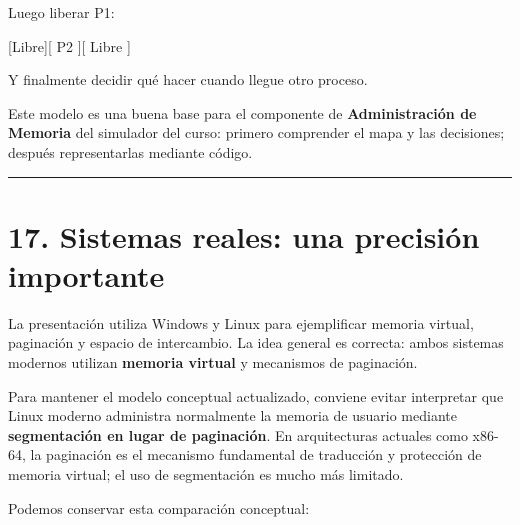 \documentclass[
  spanish,
  letterpaper,
]{scrbook}
\newenvironment{Shaded}{\begin{snugshade}}{\end{snugshade}}
\newcommand{\NormalTok}[1]{\textcolor[rgb]{0.00,0.23,0.31}{#1}}
\begin{document}
Luego liberar P1:

\begin{Shaded}
\begin{Highlighting}[]
\NormalTok{[Libre][   P2   ][ Libre ]}
\end{Highlighting}
\end{Shaded}

Y finalmente decidir qué hacer cuando llegue otro proceso.

\begin{tcolorbox}[enhanced jigsaw, arc=.35mm, bottomrule=.15mm, bottomtitle=1mm, breakable, colback=white, colbacktitle=quarto-callout-tip-color!10!white, colframe=quarto-callout-tip-color-frame, coltitle=black, left=2mm, leftrule=.75mm, opacityback=0, opacitybacktitle=0.6, rightrule=.15mm, title=\textcolor{quarto-callout-tip-color}{\faLightbulb}\hspace{0.5em}{Conexión con el proyecto integrador}, titlerule=0mm, toprule=.15mm, toptitle=1mm]

Este modelo es una buena base para el componente de
\textbf{Administración de Memoria} del simulador del curso: primero
comprender el mapa y las decisiones; después representarlas mediante
código.

\end{tcolorbox}

\begin{center}\rule{0.5\linewidth}{0.5pt}\end{center}


\chapter{17. Sistemas reales: una precisión
importante}\label{sistemas-reales-una-precisiuxf3n-importante}

La presentación utiliza Windows y Linux para ejemplificar memoria
virtual, paginación y espacio de intercambio. La idea general es
correcta: ambos sistemas modernos utilizan \textbf{memoria virtual} y
mecanismos de paginación.

Para mantener el modelo conceptual actualizado, conviene evitar
interpretar que Linux moderno administra normalmente la memoria de
usuario mediante \textbf{segmentación en lugar de paginación}. En
arquitecturas actuales como x86-64, la paginación es el mecanismo
fundamental de traducción y protección de memoria virtual; el uso de
segmentación es mucho más limitado.

Podemos conservar esta comparación conceptual:
\end{document}
